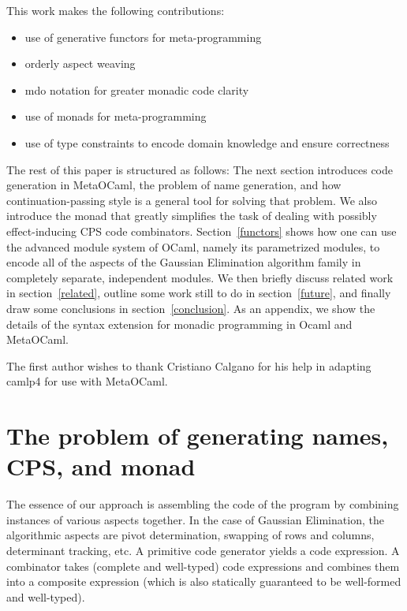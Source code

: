 \documentclass{llncs}
\begin{document}
This work makes the following contributions:
\vspace*{-2pt}
\begin{itemize}
    \item use of generative functors for meta-programming
    \item orderly aspect weaving
    \item mdo notation for greater monadic code clarity
    \item use of monads for meta-programming
    \item use of type constraints to encode domain knowledge and 
		ensure correctness
\end{itemize}

The rest of this paper is structured as follows:
The next section introduces code generation in MetaOCaml, the problem
of name generation, and how continuation-passing style is a general
tool for solving that problem.  We also introduce
the monad that greatly simplifies the task of dealing with
possibly effect-inducing CPS code combinators.  Section~\ref{functors}
shows how one can use the advanced module system of OCaml, namely its
parametrized modules, to encode all of the aspects of the Gaussian
Elimination algorithm family in completely separate, independent modules.
We then briefly discuss related work in section~\ref{related}, outline
some work still to do in section~\ref{future}, and finally draw some 
conclusions in section~\ref{conclusion}.  As an appendix, we show
the details of the syntax extension for monadic programming in Ocaml
and MetaOCaml.

The first author wishes to thank Cristiano Calgano for his help in
adapting camlp4 for use with MetaOCaml.

\section{The problem of generating names, CPS, and monad}\label{CPS}

The essence of our approach is assembling the code of the program by
combining instances of various aspects together. In the case of
Gaussian Elimination, the algorithmic aspects are pivot determination, 
swapping of
rows and columns, determinant tracking, etc. A primitive code
generator yields a code expression.  A combinator takes (complete and
well-typed) code expressions and combines them into a composite expression
(which is also statically guaranteed to be well-formed and well-typed).
\end{document}
